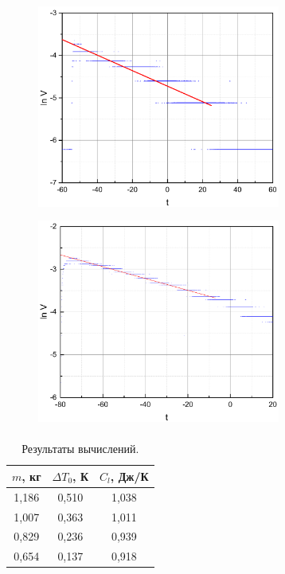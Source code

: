 \documentclass[a4paper,12pt]{article} %
\begin{document}
\begin{figure}[h!]
\begin{floatrow}
         {\includegraphics[width=8cm,height=7cm]{Graph_2_3}}
         {\includegraphics[width=8cm,height=7cm]{Graph_2_4}}         
\end{floatrow}
\end{figure}

	\begin{table}[H]
		\caption{Результаты вычислений.}
		\label{table:results_2}
		\begin{tabular}{|c|c|c|}
\hline
$m$, кг & $\Delta T_0$, К & $C_l$, Дж/К \\ \hline
1,186   & 0,510          & 1,038 \\ \hline
1,007   & 0,363          & 1,011 \\ \hline
0,829   & 0,236          & 0,939 \\ \hline
0,654   & 0,137          & 0,918 \\ \hline
\end{tabular}
	\end{table}
\end{document}
